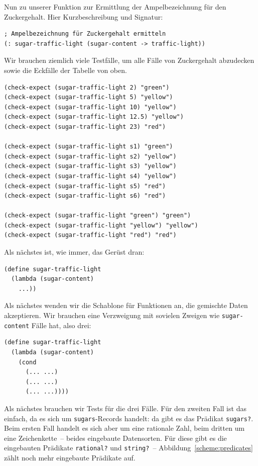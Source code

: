Nun zu unserer Funktion zur Ermittlung der Ampelbezeichnung für den
Zuckergehalt.  Hier Kurzbeschreibung und Signatur:
%
\begin{lstlisting}
; Ampelbezeichnung für Zuckergehalt ermitteln
(: sugar-traffic-light (sugar-content -> traffic-light))
\end{lstlisting}
%
Wir brauchen ziemlich viele Testfälle, um alle Fälle von
Zuckergehalt abzudecken sowie die Eckfälle der Tabelle von oben.
%
\begin{lstlisting}
(check-expect (sugar-traffic-light 2) "green")
(check-expect (sugar-traffic-light 5) "yellow")
(check-expect (sugar-traffic-light 10) "yellow")
(check-expect (sugar-traffic-light 12.5) "yellow")
(check-expect (sugar-traffic-light 23) "red")

(check-expect (sugar-traffic-light s1) "green")
(check-expect (sugar-traffic-light s2) "yellow")
(check-expect (sugar-traffic-light s3) "yellow")
(check-expect (sugar-traffic-light s4) "yellow")
(check-expect (sugar-traffic-light s5) "red")
(check-expect (sugar-traffic-light s6) "red")

(check-expect (sugar-traffic-light "green") "green")
(check-expect (sugar-traffic-light "yellow") "yellow")
(check-expect (sugar-traffic-light "red") "red")
\end{lstlisting}
%
Als nächstes ist, wie immer, das Gerüst dran:
%
\begin{lstlisting}
(define sugar-traffic-light
  (lambda (sugar-content)
    ...))
\end{lstlisting}         
%
Als nächstes wenden wir die Schablone für Funktionen an, die gemischte
Daten akzeptieren.  Wir brauchen eine Verzweigung mit sovielen Zweigen
wie \lstinline{sugar-content} Fälle hat, also drei:
%
\begin{lstlisting}
(define sugar-traffic-light
  (lambda (sugar-content)
    (cond
      (... ...)
      (... ...)
      (... ...))))
\end{lstlisting}         
%
Als nächstes brauchen wir Tests für die drei Fälle.  Für den zweiten
Fall ist das einfach, da es sich um \lstinline{sugars}-Records handelt:
da gibt es das Prädikat \lstinline{sugars?}.  Beim ersten Fall handelt es
sich aber um eine rationale Zahl, beim dritten um eine Zeichenkette~--
beides eingebaute Datensorten.  Für diese gibt es die eingebauten
Prädikate \lstinline{rational?} und \lstinline{string?}~--
Abbildung~\ref{scheme:predicates} zählt noch mehr eingebaute
Prädikate auf.
%
